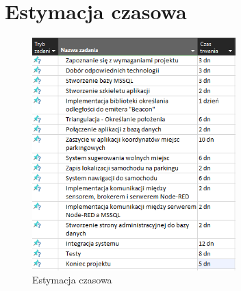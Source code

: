\documentclass[12pt,a4paper]{article}
\begin{document}
\section{Estymacja czasowa}
\begin{figure}[htb!p]
\begin{center}
\includegraphics[width=0.7\textwidth]{unknown.png}
\caption{Estymacja czasowa}
\end{center}
\end{figure}



















\end{document}
